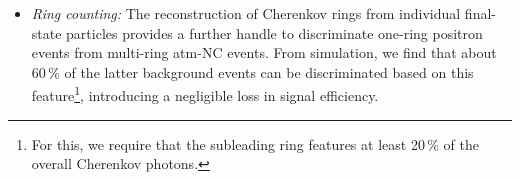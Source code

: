 \begin{itemize}

\item {\it Ring counting:} The reconstruction of Cherenkov rings from individual final-state particles provides a further handle to discriminate one-ring positron events from multi-ring atm-NC events. From simulation, we find that about 60\,\% of the latter background events can be discriminated based on this feature\footnote{For this, we require that the subleading ring features at least 20\,\% of the overall Cherenkov photons.}, introducing a negligible loss in signal efficiency.



\end{itemize}

